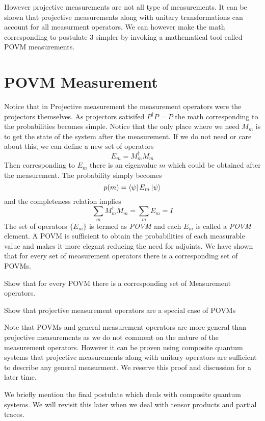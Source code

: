 However projective measurements are not all type of measurements. It can be shown that projective measurements along with unitary transformations can account for all measurment operators. We can however make the math corresponding to postulate 3 simpler by invoking a mathematical tool called POVM measurements.

\section{POVM Measurement}

Notice that in Projective measurement the measurement operators were the projectors themselves. As projectors satisifed $P^{\dagger}P = P$ the math corresponding to the probabilities becomes simple. Notice that the only place where we need $M_m$ is to get the state of the system after the measurement. If we do not need or care about this, we can define a new set of operators 
$$E_m = M_m^{\dagger}M_m $$
Then corresponding to $E_m$ there is an eigenvalue $m$ which could be obtained after the measurement. The probability simply becomes
$$p(m) = \bra{\psi}E_m\ket{\psi}$$
and the completeness relation implies 
$$ \sum_m M_m^{\dagger}M_m = \sum_m E_m = I$$
The set of operators $\{E_m\}$ is termed as \textit{POVM} and each $E_m$ is called a \textit{POVM} element. A POVM is sufficient to obtain the probabilities of each measurable value and makes it more elegant reducing the need for adjoints. We have shown that for every set of measurement operators there is a corresponding set of POVMs.

\begin{exercise}
Show that for every POVM there is a corresponding set of Measurement operators.
\end{exercise}
\begin{exercise}
Show that projective measurement operators are a special case of POVMs
\end{exercise}

Note that POVMs and general measurement operators are more general than projective measurements as we do not comment on the nature of the measurement operators. However it can be proven using composite quantum systems that projective measurements along with unitary operators are sufficient to describe any general measurment. We reserve this proof and discussion for a later time.

We briefly mention the final postulate which deals with composite quantum systems. We will revisit this later when we deal with tensor products and partial traces.

